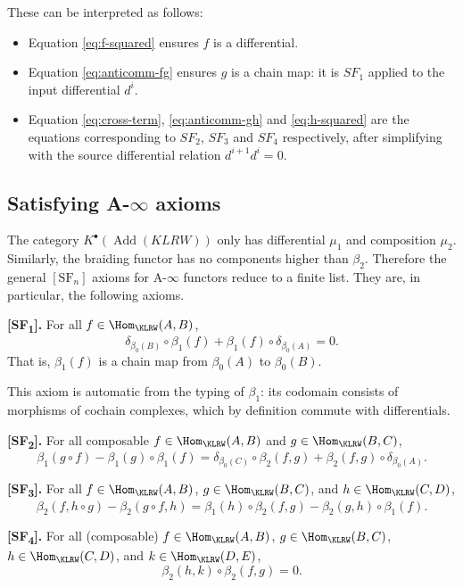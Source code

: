 These can be interpreted as follows:

\begin{itemize}
    \item Equation \ref{eq:f-squared} ensures $f$ is a differential.
    \item Equation \ref{eq:anticomm-fg} ensures $g$ is a chain map: it is $SF_1$ applied to the input differential $d^i$.
    \item Equation \ref{eq:cross-term}, \ref{eq:anticomm-gh} and \ref{eq:h-squared} are the equations corresponding to $SF_2$, $SF_3$ and $SF_4$ respectively, after simplifying with the source differential relation $d^{i+1}d^i=0$.
\end{itemize}

\subsection{Satisfying A-\texorpdfstring{$\infty$}{infinity} axioms}

The category $K^\bullet(\operatorname{Add}(KLRW))$ only has differential $\mu_1$ and composition $\mu_2$. Similarly, the braiding functor has no components higher than $\beta_2$. Therefore the general $[\text{SF}_n]$ axioms for A-$\infty$ functors reduce to a finite list. They are, in particular, the following axioms.

\textbf{[SF\textsubscript{1}].}
For all $f \in \Hom_{\KLRW}(A, B)$,
$$
  \delta_{\beta_0(B)} \circ \beta_1(f) + \beta_1(f) \circ \delta_{\beta_0(A)} = 0.
$$
That is, $\beta_1(f)$ is a chain map from $\beta_0(A)$ to $\beta_0(B)$.

\begin{remark}
  This axiom is automatic from the typing of $\beta_1$: its codomain
  consists of morphisms of cochain complexes, which by definition
  commute with differentials.
\end{remark}

\textbf{[SF\textsubscript{2}].}
For all composable $f \in \Hom_{\KLRW}(A, B)$ and $g \in \Hom_{\KLRW}(B, C)$,
$$
  \beta_1(g \circ f) - \beta_1(g) \circ \beta_1(f)
  = \delta_{\beta_0(C)} \circ \beta_2(f, g) + \beta_2(f, g) \circ \delta_{\beta_0(A)}.
$$

\textbf{[SF\textsubscript{3}].}
For all $f \in \Hom_{\KLRW}(A, B)$,
$g \in \Hom_{\KLRW}(B, C)$, and $h \in \Hom_{\KLRW}(C, D)$,
$$
  \beta_2(f, h \circ g) - \beta_2(g \circ f, h)
  = \beta_1(h) \circ \beta_2(f, g) -  \beta_2(g, h)\circ \beta_1(f).
$$

\textbf{[SF\textsubscript{4}].}
For all (composable) $f \in \Hom_{\KLRW}(A, B)$,
$g \in \Hom_{\KLRW}(B, C)$, $h \in \Hom_{\KLRW}(C, D)$, and
$k \in \Hom_{\KLRW}(D, E)$,
$$
  \beta_2(h, k) \circ \beta_2(f, g)= 0.
$$

